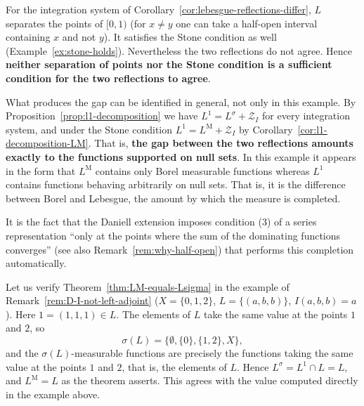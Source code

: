 \begin{remark}\label{rem:separation-not-sufficient}
  For the integration system of
  Corollary~\ref{cor:lebesgue-reflections-differ}, $L$ separates the points of
  $[0,1)$ (for $x\ne y$ one can take a half-open interval containing $x$ and not
  $y$).
  It satisfies the Stone condition as well
  (Example~\ref{ex:stone-holds}).
  Nevertheless the two reflections do not agree.
  Hence \textbf{neither separation of points nor the Stone condition is a
  sufficient condition for the two reflections to agree}.

  What produces the gap can be identified in general, not only in this example.
  By Proposition~\ref{prop:l1-decomposition} we have
  $L^1=L^{\sigma}+\mathcal{Z}_I$ for every integration system, and under the
  Stone condition $L^1=L^{\mathrm{M}}+\mathcal{Z}_I$ by
  Corollary~\ref{cor:l1-decomposition-LM}.
  That is, \textbf{the gap between the two reflections amounts exactly to the
  functions supported on null sets}.
  In this example it appears in the form that $L^{\mathrm{M}}$ contains only
  Borel measurable functions whereas $L^1$ contains functions behaving
  arbitrarily on null sets.
  That is, it is the difference between Borel and Lebesgue, the amount by which
  the measure is completed.

  It is the fact that the Daniell extension imposes condition (3) of a series
  representation ``only at the points where the sum of the dominating functions
  converges'' (see also Remark~\ref{rem:why-half-open}) that performs this
  completion automatically.
\end{remark}

\begin{example}
  Let us verify Theorem~\ref{thm:LM-equals-Lsigma} in the example of
  Remark~\ref{rem:D-I-not-left-adjoint} ($X=\{0,1,2\}$, $L=\{(a,b,b)\}$,
  $I(a,b,b)=a$).
  Here $1=(1,1,1)\in L$.
  The elements of $L$ take the same value at the points $1$ and $2$, so
  \[
    \sigma(L)=\{\emptyset,\{0\},\{1,2\},X\} ,
  \]
  and the $\sigma(L)$-measurable functions are precisely the functions taking the
  same value at the points $1$ and $2$, that is, the elements of $L$.
  Hence $L^{\sigma}=L^1\cap L=L$, and $L^{\mathrm{M}}=L$ as the theorem asserts.
  This agrees with the value computed directly in the example above.
\end{example}

